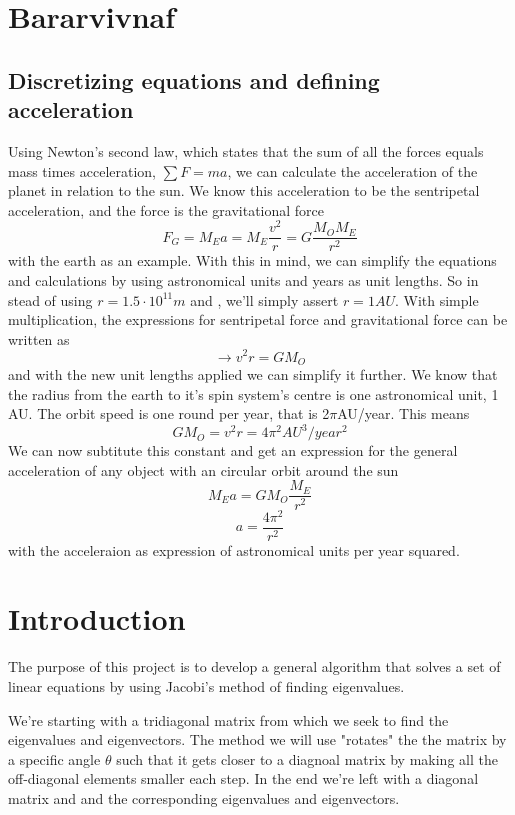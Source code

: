 \documentclass[10pt]{article}
\begin{document}
\begin{multicols}{2}

\section{Bararvivnaf}
\subsection{Discretizing equations and defining acceleration}
Using Newton's second law, which states that the sum of all the forces equals mass times acceleration, $\sum F=ma$, we can calculate the acceleration of the planet in relation to the sun. We know this acceleration to be the sentripetal acceleration, and the force is the gravitational force
$$F_G = M_Ea = M_E\frac{v^2}{r} = G\frac{M_OM_E}{r^2}$$
with the earth as an example. With this in mind, we can simplify the equations and calculations by using astronomical units and years as unit lengths. So in stead of using $r = 1.5\cdot10^{11}m$ and , we'll simply assert $r = 1AU$. With simple multiplication, the expressions for sentripetal force and gravitational force can be written as 
$$\rightarrow v^2r = GM_O$$
and with the new unit lengths applied we can simplify it further. We know that the radius from the earth to it's spin system's centre is one astronomical unit, 1 AU. The orbit speed is one round per year, that is 2$\pi$AU/year. This means
$$GM_O = v^2r = 4\pi^2AU^3/year^2$$
We can now subtitute this constant and get an expression for the general acceleration of any object with an circular orbit around the sun
$$M_Ea = GM_O\frac{M_E}{r^2}$$
$$a = \frac{4\pi^2}{r^2}$$
with the acceleraion as expression of astronomical units per year squared. 


\section{Introduction}
    The purpose of this project is to develop a general algorithm that
    solves a set of linear equations by using Jacobi's method of finding
    eigenvalues. 

We're starting with a tridiagonal matrix from which we seek to find the
eigenvalues and eigenvectors. The method we will use "rotates" the the
matrix by a specific angle $\theta$ such that it gets closer to a diagnoal
matrix by making all the off-diagonal elements smaller each step. In the
end we're left with a diagonal matrix and and the corresponding eigenvalues
and eigenvectors.


\end{multicols}
\end{document}
